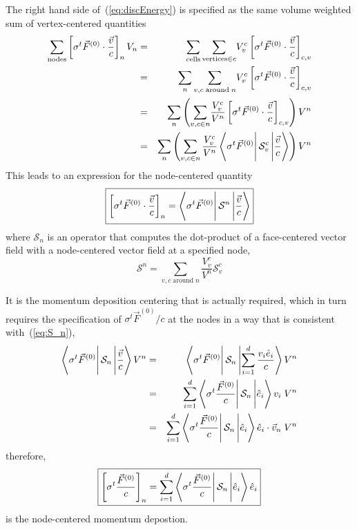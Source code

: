 \documentclass{article}
\newcommand{\bracket}[3]{%
  \ensuremath{%
       \left\langle {#1} \rule{0mm}{4ex} \right|%
       {#2} \left| {#3}  \rule{0mm}{4ex} \right\rangle%
  }%
}
\begin{document}
The right hand side of~(\ref{eq:discEnergy}) is specified as 
the same
volume weighted sum of vertex-centered quantities
\begin{eqnarray}
\sum_{\text{nodes}}
      \left[ \sigma^{t} \vec{F}^{(0)} \cdot \frac{\vec{v}}{c} \right]_{n} V_{n}
  &=& \sum_{\text{cells}} 
      \sum_{\text{vertices} \in c} \! V^{c}_{v}
       \left[ \sigma^{t} \vec{F}^{(0)} \cdot \frac{\vec{v}}{c}
        \right]_{c,v} \\
  &=& \sum_{n} 
      \sum_{v,c \;\text{around}\; n} \! V^{c}_{v}
       \left[ \sigma^{t} \vec{F}^{(0)} \cdot \frac{\vec{v}}{c}
        \right]_{c,v} \\
  &=& \sum_{n} \left( 
      \sum_{v,c \in n} \! \frac{V^{c}_{v}}{V^{n}}
       \left[ \sigma^{t} \vec{F}^{(0)} \cdot \frac{\vec{v}}{c}
        \right]_{c,v} \right) V^{n} \\
  &=& \sum_{n} \left( \sum_{ v,c \in n} \frac{V^{c}_{v}}{V^{n}}
        \bracket{\sigma^{t} \vec{F}^{(0)}}
                {\mathcal{S}^{c}_{v}}{\frac{\vec{v}}{c}} \right) V^{n}
\end{eqnarray}
This leads to an expression for the node-centered quantity
\begin{equation}
\boxed{
  \left[ \sigma^{t} \vec{F}^{(0)} \cdot \frac{\vec{v}}{c} \right]_{n}
    = \bracket{\sigma^{t} \vec{F}^{(0)}}{\mathcal{S}^{n}}{\frac{\vec{v}}{c}}
}
\end{equation}
where $\mathcal{S}_{n}$ is an operator that computes the dot-product
of a face-centered vector field with a node-centered vector field at
a specified node,
\begin{equation}
 \boxed{
   \mathcal{S}^{n} = \sum_{ v,c \; \text{around} \; n}
                        \frac{V^{c}_{v}}{V^{n}}\mathcal{S}^{c}_{v}
 }
\label{eq:S_n}
\end{equation}

It is the momentum deposition centering that
is actually required, which in turn requires
the specification of $\sigma^{t} \vec{F}^{(0)} / c$ at the nodes in
a way that
is consistent with~(\ref{eq:S_n}),
\begin{eqnarray}
   \bracket{\sigma^{t} \vec{F}^{(0)}}
                       {\mathcal{S}_{n}}
                       {\frac{\vec{v}}{c}} V^{n}
  &=&  \bracket{\sigma^{t} \vec{F}^{(0)}}
                       {\mathcal{S}_{n}}
                       {\sum_{i=1}^{d} \frac{v_{i}\hat{e}_{i}}{c}} V^{n}
   \\
  &=&  \sum_{i=1}^{d} \bracket{\sigma^{t} \frac{\vec{F}^{(0)}}{c}}
                       {\mathcal{S}_{n}}
                       {\hat{e}_{i}}v_{i} \; V^{n}
   \\
  &=&  \sum_{i=1}^{d} \bracket{\sigma^{t} \frac{\vec{F}^{(0)}}{c}}
                       {\mathcal{S}_{n}}
                       {\hat{e}_{i}} \hat{e}_{i} \cdot \vec{v}_{n}
                         \; V^{n}
\end{eqnarray}
therefore,
\begin{equation}
 \boxed{
\left[ \sigma^{t} \frac{\vec{F}^{(0)}}{c} \right]_{n}
    = \sum_{i=1}^{d} \bracket{\sigma^{t} \frac{\vec{F}^{(0)}}{c}}
                       {\mathcal{S}_{n}}
                       {\hat{e}_{i}} \hat{e}_{i}
}
\end{equation}
is the node-centered momentum depostion.
\end{document}
